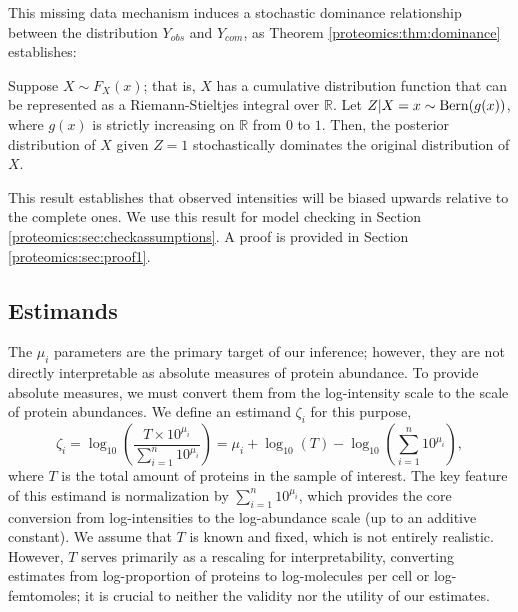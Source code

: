 This missing data mechanism induces a stochastic dominance relationship between the distribution $Y_{obs}$ and $Y_{com}$, as Theorem \ref{proteomics:thm:dominance} establishes:
%
\begin{theorem}\label{proteomics:thm:dominance}
Suppose $X \sim F_X(x)$; that is, $X$ has a cumulative distribution function that can be represented as a Riemann-Stieltjes integral over $\mathbb{R}$. Let $Z | X=x \sim \operatorname{Bern}( g(x) )$, where $g(x)$ is strictly increasing on $\mathbb{R}$ from $0$ to $1$. Then, the posterior distribution of $X$ given $Z=1$ stochastically dominates the original distribution of $X$.
\end{theorem}
%
This result establishes that observed intensities will be biased upwards relative to the complete ones.
We use this result for model checking in Section \ref{proteomics:sec:checkassumptions}. A proof is provided in Section \ref{proteomics:sec:proof1}.



\subsection{Estimands}
\label{proteomics:sec:estimand}

The $\mu_i$ parameters are the primary target of our inference; however, they are not directly interpretable as absolute measures of protein abundance.
To provide absolute measures, we must convert them from the log-intensity scale to the scale of protein abundances.
We define an estimand $\zeta_i$ for this purpose, 
%
\begin{equation}
\zeta_i = \log_{10} \left( \frac{T \times 10^{\mu_i}}{ \sum_{i=1}^{n} 10^{\mu_i}} \right) = \mu_i + \log_{10}(T) - \log_{10}\left(\sum_{i=1}^{n} 10^{\mu_i}\right), \label{proteomics:eq:abs_abund_estimand} 
\end{equation}
%
where $T$ is the total amount of proteins in the sample of interest.
The key feature of this estimand is normalization by $\sum_{i=1}^n 10^{\mu_i}$, which provides the core conversion from log-intensities to the log-abundance scale (up to an additive constant).
We assume that $T$ is known and fixed, which is not entirely realistic.
However, $T$ serves primarily as a rescaling for interpretability, converting estimates from log-proportion of proteins to log-molecules per cell or log-femtomoles; it is crucial to neither the validity nor the utility of our estimates.



